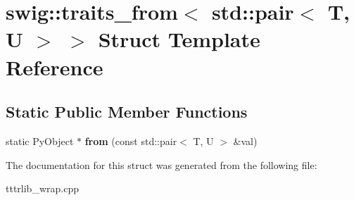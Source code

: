 \hypertarget{structswig_1_1traits__from_3_01std_1_1pair_3_01_t_00_01_u_01_4_01_4}{}\section{swig\+:\+:traits\+\_\+from$<$ std\+:\+:pair$<$ T, U $>$ $>$ Struct Template Reference}
\label{structswig_1_1traits__from_3_01std_1_1pair_3_01_t_00_01_u_01_4_01_4}
\subsection*{Static Public Member Functions}
\begin{DoxyCompactItemize}
\item 
\mbox{\label{structswig_1_1traits__from_3_01std_1_1pair_3_01_t_00_01_u_01_4_01_4_a8d5dbe4816fb56349947140186869e95}} 
static Py\+Object $\ast$ {\bfseries from} (const std\+::pair$<$ T, U $>$ \&val)
\end{DoxyCompactItemize}


The documentation for this struct was generated from the following file\+:\begin{DoxyCompactItemize}
\item 
tttrlib\+\_\+wrap.\+cpp\end{DoxyCompactItemize}
